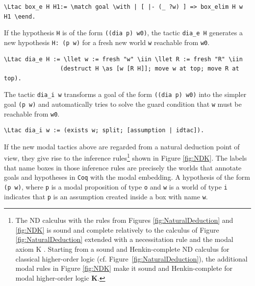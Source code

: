 \documentclass{llncs}
\newcommand{\red}[1]{\textcolor[rgb]{1,0,0}{#1}}
\newcommand{\blue}[1]{\textcolor[rgb]{0,0,1}{#1}}
\newcommand{\Ltac}{\red{Ltac}}
\newcommand{\llet}{\blue{let}}
\newcommand{\match}{\blue{match}}
\newcommand{\with}{\blue{with}}
\newcommand{\eend}{\blue{end}}
\newcommand{\iin}{\blue{in}}
\newcommand{\as}{\blue{as}}
\newcommand{\Coq}{\texttt{Coq}\xspace}
\begin{document}
\begin{Verbatim}[commandchars=\\\{\},fontsize=\verbsize]
\Ltac box_e H H1:= \match goal \with | [ |- (_ ?w) ] => box_elim H w H1 \eend.
\end{Verbatim}

\noindent 
If the hypothesis \texttt{H} is of the form \texttt{((dia p)
w0)}, the tactic \texttt{dia\_e H} generates a new hypothesis
\texttt{H: (p w)} for a fresh new world \texttt{w} reachable from
\texttt{w0}.

\begin{Verbatim}[commandchars=\\\{\},fontsize=\verbsize]
\Ltac dia_e H := \llet w := fresh "w" \iin \llet R := fresh "R" \iin 
                (destruct H \as [w [R H]]; move w at top; move R at top).
\end{Verbatim}

\noindent
The tactic \texttt{dia\_i w} transforms a goal of the form 
\texttt{((dia p) w0)} into the simpler goal \texttt{(p w)} 
and automatically tries to solve the guard condition that 
\texttt{w} must be reachable from \texttt{w0}.

\begin{Verbatim}[commandchars=\\\{\},fontsize=\verbsize]
\Ltac dia_i w := (exists w; split; [assumption | idtac]).
\end{Verbatim}

\noindent If the new modal tactics above are regarded from a natural
deduction point of view, they give rise to the inference
rules\footnote{The ND calculus with the rules from
Figures \ref{fig:NaturalDeduction} and \ref{fig:NDK} is sound and
complete relatively to the calculus of Figure
\ref{fig:NaturalDeduction} extended with a necessitation rule and the
modal axiom K \cite{ToDo:UnpublishedPaperInGithub}. Starting from a sound and Henkin-complete ND calculus for classical higher-order logic (cf. Figure~\ref{fig:NaturalDeduction}), the additional
modal rules in Figure \ref{fig:NDK} make it sound and Henkin-complete
for modal higher-order logic \textbf{K}.} shown in Figure
\ref{fig:NDK}. The labels that name boxes in those inference rules are
precisely the worlds that annotate goals and hypotheses in \Coq with
the modal embedding. A hypothesis of the form \texttt{(p w)}, where
\texttt{p} is a modal proposition of type \texttt{o} and \texttt{w} is
a world of type \texttt{i} indicates that \texttt{p} is an assumption
created inside a box with name \texttt{w}.
\end{document}
